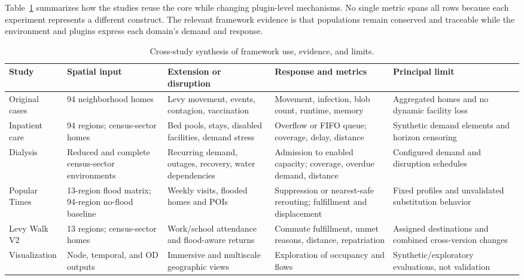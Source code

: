 \documentclass[pdflatex,sn-mathphys-num]{sn-jnl}%
\theoremstyle{thmstyleone}%
\theoremstyle{thmstyletwo}%
\theoremstyle{thmstylethree}%
\begin{document}
Table~\ref{tbl:cross_study_synthesis} summarizes how the studies reuse the core while changing plugin-level mechanisms. No single metric spans all rows because each experiment represents a different construct. The relevant framework evidence is that populations remain conserved and traceable while the environment and plugins express each domain's demand and response.

\begin{table}[ht]
\centering
\scriptsize
\caption{Cross-study synthesis of framework use, evidence, and limits.}
\label{tbl:cross_study_synthesis}
\begin{tabularx}{\linewidth}{@{}p{2.0cm}p{2.0cm}p{2.5cm}XX@{}}
\toprule
\textbf{Study} & \textbf{Spatial input} & \textbf{Extension or disruption} & \textbf{Response and metrics} & \textbf{Principal limit} \\ \midrule
Original cases & 94 neighborhood homes & Levy movement, events, contagion, vaccination & Movement, infection, blob count, runtime, memory & Aggregated homes and no dynamic facility loss \\ \midrule
Inpatient care & 94 regions; census-sector homes & Bed pools, stays, disabled facilities, demand stress & Overflow or FIFO queue; coverage, delay, distance & Synthetic demand elements and horizon censoring \\ \midrule
Dialysis & Reduced and complete census-sector environments & Recurring demand, outages, recovery, water dependencies & Admission to enabled capacity; coverage, overdue demand, distance & Configured demand and disruption schedules \\ \midrule
Popular Times & 13-region flood matrix; 94-region no-flood baseline & Weekly visits, flooded homes and POIs & Suppression or nearest-safe rerouting; fulfillment and displacement & Fixed profiles and unvalidated substitution behavior \\ \midrule
Levy Walk V2 & 13 regions; census-sector homes & Work/school attendance and flood-aware returns & Commute fulfillment, unmet reasons, distance, repatriation & Assigned destinations and combined cross-version changes \\ \midrule
Visualization & Node, temporal, and OD outputs & Immersive and multiscale geographic views & Exploration of occupancy and flows & Synthetic/exploratory evaluations, not validation \\ \bottomrule
\end{tabularx}
\end{table}
\end{document}
